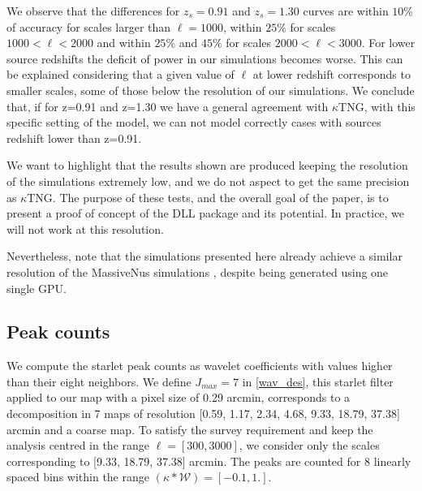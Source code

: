 \documentclass{aa}
\begin{document}
We observe that the differences for $z_s=0.91$ and  $z_s=1.30$ curves are within $10\%$ of accuracy for scales larger than $\ell=1000$, within $25\%$  for scales $1000<\ell<2000$ and  within $25\%$ and $45\%$ for scales $2000<\ell<3000$. For lower source redshifts the deficit of power in our simulations becomes worse. This can be explained considering that a given value of $\ell$ at lower redshift corresponds to smaller scales, some of those below the resolution of our simulations. We conclude that, if for z=0.91 and z=1.30 we have a general agreement with $\kappa$TNG, with this specific setting of the model, we can not model correctly cases with sources redshift lower than z=0.91.


 We want to highlight that the results shown are produced keeping the resolution of the simulations extremely low, and we do not aspect to get the same precision as $\kappa$TNG. The purpose of these tests, and the overall goal of the paper, is to present a proof of concept of the DLL package and its potential.  In practice, we will not work at this resolution. 

Nevertheless, note that the simulations presented here already achieve a similar resolution of the MassiveNus simulations \citep{liu2018massivenus}, despite being generated using one single GPU. 


\subsection{Peak counts}\label{peak_sec}
We compute the starlet peak counts as wavelet coefficients with values higher than their eight neighbors. 
We define $J_{max}=7$ in \autoref{wav_des}, this starlet filter applied to our map with a pixel size of 0.29 arcmin, corresponds to a decomposition in 7 maps of resolution [0.59, 1.17, 2.34, 4.68, 9.33, 18.79, 37.38] arcmin and a coarse map. To satisfy the survey requirement and keep the analysis centred in the range $\ell=[300, 3000]$, we consider only the scales corresponding to [9.33, 18.79, 37.38] arcmin. The peaks are counted for 8 linearly spaced bins within the range $(\kappa*\mathcal{W})=[-0.1, 1.]$. 
\end{document}
